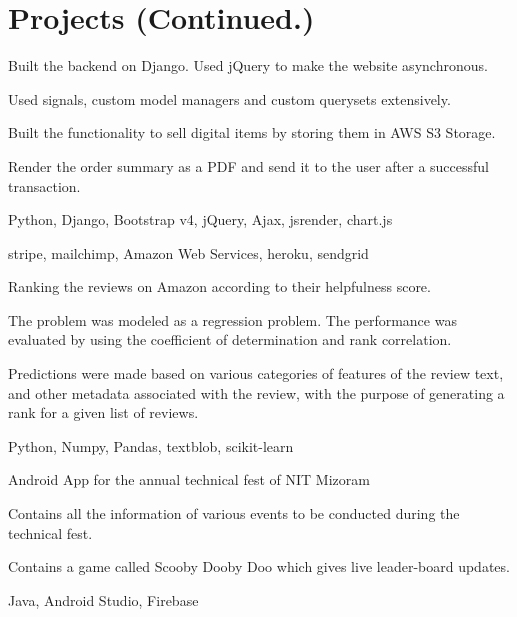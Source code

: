 \section{Projects \small{(Continued.)}}

 \vspace{0.1in}
\begin{tightemize}
\item Built the backend on Django. Used jQuery to make the website asynchronous.
\item Used signals, custom model managers and custom querysets extensively.
\item Built the functionality to sell digital items by storing them in AWS S3 Storage.
\item Render the order summary as a PDF and send it to the user after a successful transaction.
\item {} Python, Django, Bootstrap v4, jQuery, Ajax, jsrender, chart.js
\item {} stripe, mailchimp, Amazon Web Services, heroku, sendgrid
\end{tightemize}
\sectionsep

\begin{tightemize}
\item Ranking the reviews on Amazon according to their helpfulness score.
\item The problem was modeled as a regression problem. The performance was evaluated by using the coefficient of determination and rank correlation.
\item Predictions were made based on various categories of features of the review text, and other metadata associated with the review, with the purpose of generating a rank for a given list of reviews.
\item {} Python, Numpy, Pandas, textblob, scikit-learn
\end{tightemize}
\sectionsep

\begin{tightemize}\item Android App for the annual technical fest of NIT Mizoram
\item Contains all the information of various events to be conducted during the technical fest.
\item Contains a game called Scooby Dooby Doo which gives live leader-board updates.
\item {} Java, Android Studio, Firebase
\end{tightemize}
\sectionsep